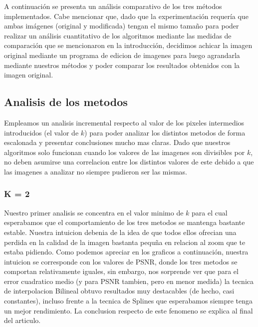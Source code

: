 A continuación se presenta un análisis comparativo de los tres métodos implementados.
Cabe mencionar que, dado que la experimentación requería que ambas imágenes (original y modificada) tengan el mismo tamaño para poder realizar un análisis cuantitativo de los algoritmos mediante las medidas de comparación que se mencionaron en la introducción, decidimos achicar la imagen original mediante un programa de edicion de imagenes para luego agrandarla mediante nuestros métodos y poder comparar los resultados obtenidos con la imagen original.

\subsection{Analisis de los metodos}

Empleamos un analisis incremental respecto al valor de los pixeles intermedios introducidos (el valor de $k$) para poder analizar los distintos metodos de forma escalonada y presentar conclusiones mucho mas claras. Dado que nuestros algoritmos solo funcionan cuando los valores de las imagenes son divisibles por $k$, no deben asumirse una correlacion entre los distintos valores de este debido a que las imagenes a analizar no siempre pudieron ser las mismas.

\subsubsection{K = 2}
Nuestro primer analisis se concentra en el valor minimo de $k$ para el cual esperabamos que el comportamiento de los tres metodos se mantenga bastante estable. Nuestra intuicion debenia de la idea de que todos ellos ofrecian una perdida en la calidad de la imagen bastanta pequ\~na en relacion al zoom que te estaba pidiendo.
Como podemos apreciar en los graficos a continuación, nuestra intuicion se corresponde con los valores de PSNR, donde los tres metodos se comportan relativamente iguales, sin embargo, nos sorprende ver que para el error cuadratico medio (y para PSNR tambien, pero en menor medida) la tecnica de interpolacion Bilineal obtuvo resultados muy destacables (de hecho, casi constantes), incluso frente a la tecnica de Splines que esperabamos siempre tenga un mejor rendimiento. La conclusion respecto de este fenomeno se explica al final del articulo.

